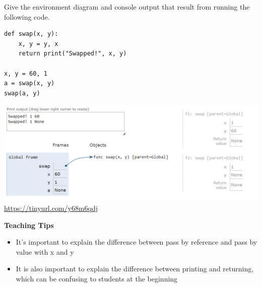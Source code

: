 \begin{blocksection}
\question Give the environment diagram and console output that result from running the following code.

\begin{lstlisting}
def swap(x, y):
    x, y = y, x
    return print("Swapped!", x, y)

x, y = 60, 1
a = swap(x, y)
swap(a, y)
\end{lstlisting}

\begin{solution}[2in]
\includegraphics[scale=0.5]{swap.png}
\\
\url{https://tinyurl.com/y68m6qdj}
\end{solution}
\end{blocksection}

\begin{questionmeta}
\textbf{Teaching Tips}
  \begin{itemize}
    \item It's important to explain the difference between pass by reference and pass by value with x and y
    \item It is also important to explain the difference between printing and returning, which can be confusing to students at the beginning
  \end{itemize}
\end{questionmeta}
